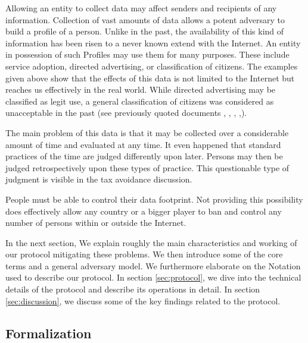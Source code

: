 \documentclass[10pt,journal,compsoc,twocolumn,twoside]{IEEEtran}
\begin{document}

Allowing an entity to collect data may affect senders and recipients of any information. Collection of vast amounts of data allows a potent adversary to build a  profile of a person. Unlike in the past, the availability of this kind of information has been risen to a never known extend with the Internet. An entity in possession of such Profiles may use them for many purposes. These include service adoption, directed advertising, or classification of citizens. The examples given above show that the effects of this data is not limited to the Internet but reaches us effectively in the real world. While directed advertising may be classified as legit use, a general classification of citizens was considered as unacceptable in the past (see previously quoted documents \cite{NCR2013}, \cite{XKeyscore}, \cite{Ball2013}, \cite{Greenberg2013},\cite{Leuenberger1989}).

The main problem of this data is that it may be collected over a considerable amount of time and evaluated at any time. It even happened that standard practices of the time are judged differently upon later. Persons may then be judged retrospectively upon these types of practice. This questionable type of judgment is visible in the tax avoidance discussion\cite{Amat1999}. 

People must be able to control their data footprint. Not providing this possibility does effectively allow any country or a bigger player to ban and control any number of persons within or outside the Internet.  

In the next section, We explain roughly the main characteristics and working of our protocol mitigating these problems. We then introduce some of the core terms and a general adversary model. We furthermore elaborate on the Notation used to describe our protocol. In section \ref{sec:protocol}, we dive into the technical details of the protocol and describe its operations in detail. In section \ref{sec:discussion}, we discuss some of the key findings related to the protocol.

\subsection{Formalization}
\end{document}
